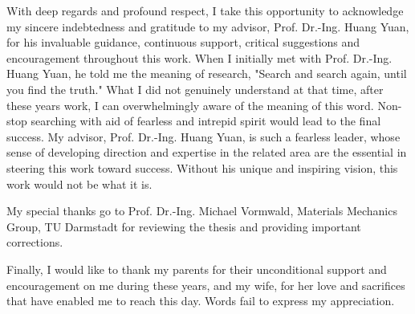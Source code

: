 

With deep regards and profound respect, I take this opportunity to acknowledge my sincere indebtedness and gratitude to my advisor, Prof. Dr.-Ing. Huang Yuan, for his invaluable guidance, continuous support, critical suggestions and encouragement throughout this work.
When I initially met with Prof. Dr.-Ing. Huang Yuan, he told me the meaning of research, "Search and search again, until you find the truth."
What I did not genuinely understand at that time, after these years work, I can overwhelmingly aware of the meaning
of this word. Non-stop searching with aid of fearless and intrepid spirit would lead to the final success.
My advisor, Prof. Dr.-Ing. Huang Yuan, is such a fearless leader, whose sense of developing direction and expertise in the related area are the essential in steering this work toward success.
Without his unique and inspiring vision, this work would not be what it is.

My special thanks go to Prof. Dr.-Ing. Michael Vormwald, Materials Mechanics Group, TU Darmstadt for reviewing the thesis and providing important corrections.


Finally, I would like to thank my parents for their unconditional support and encouragement on me during these years, and my wife, for her love and sacrifices that have enabled me to reach this day. Words fail to express my appreciation.


